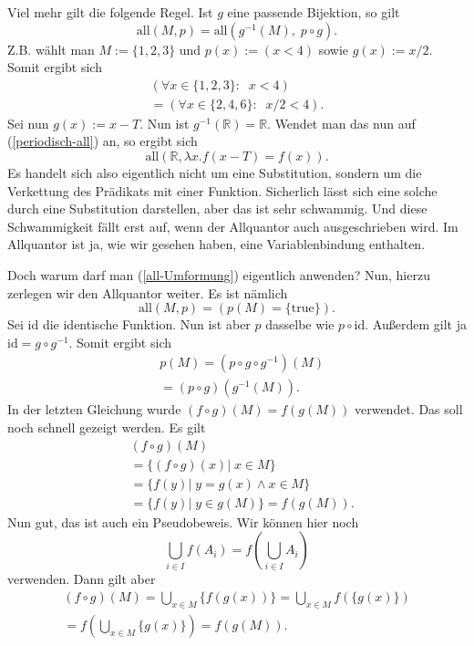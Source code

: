 \documentclass[a4paper,10pt,fleqn,twocolumn,twoside,dvipdfmx]{scrartcl}
\numberwithin{equation}{section}
\theoremstyle{rmbox}
\begin{document}
Viel mehr gilt die folgende Regel. Ist $g$ eine passende
Bijektion, so gilt
\begin{equation}\label{all-Umformung}
\mathrm{all}(M,p) = \mathrm{all}(g^{-1}(M),\;p\circ g).
\end{equation}
Z.B. wählt man $M:=\{1,2,3\}$ und $p(x):=(x{<}4)$
sowie $g(x):=x/2$. Somit ergibt sich
\begin{gather*}
(\forall x{\in}\{1,2,3\}{:}\;\; x<4)\\
= (\forall x{\in}\{2,4,6\}{:}\;\; x/2<4).
\end{gather*}
Sei nun $g(x):=x-T$. Nun ist $g^{-1}(\mathbb R)=\mathbb R$.
Wendet man das nun auf (\ref{periodisch-all}) an, so ergibt
sich
\begin{equation}
\mathrm{all}(\mathbb R, \lambda x.f(x-T)=f(x)).
\end{equation}
Es handelt sich also eigentlich nicht um eine Substitution,
sondern um die Verkettung des Prädikats mit einer Funktion.
Sicherlich lässt sich eine solche durch eine Substitution
darstellen, aber das ist sehr schwammig. Und diese Schwammigkeit
fällt erst auf, wenn der Allquantor auch ausgeschrieben wird.
Im Allquantor ist ja, wie wir gesehen haben, eine Variablenbindung
enthalten.

Doch warum darf man (\ref{all-Umformung}) eigentlich anwenden?
Nun, hierzu zerlegen wir den Allquantor weiter. Es ist nämlich
\begin{equation}
\mathrm{all}(M,p) = (p(M)=\{\mathrm{true}\}).
\end{equation}
Sei $\mathrm{id}$ die identische Funktion. Nun ist aber
$p$ dasselbe wie $p\circ \mathrm{id}$. Außerdem gilt ja
$\mathrm{id} = g\circ g^{-1}$. Somit ergibt sich
\begin{equation}
\begin{split}
& p(M) = (p\circ g\circ g^{-1})(M)\\
& = (p\circ g)(g^{-1}(M)).
\end{split}
\end{equation}
In der letzten Gleichung wurde $(f\circ g)(M)=f(g(M))$
verwendet. Das soll noch schnell gezeigt werden. Es gilt
\begin{equation}
\begin{split}
&(f\circ g)(M)\\
&= \{(f\circ g)(x)|\;x\in M\}\\
&= \{f(y)|\; y=g(x) \wedge x\in M\}\\
&= \{f(y)|\; y\in g(M)\}
= f(g(M)).
\end{split}
\end{equation}
Nun gut, das ist auch ein Pseudobeweis. Wir können hier noch
\begin{equation}
\bigcup_{i\in I} f(A_i)
= f(\bigcup_{i\in I} A_i)
\end{equation}
verwenden. Dann gilt aber
\begin{gather*}
(f\circ g)(M) = \bigcup_{x\in M} \{f(g(x))\}
= \bigcup_{x\in M} f(\{g(x)\})\\
= f(\bigcup_{x\in M}\{g(x)\})
= f(g(M)).
\end{gather*}
\end{document}
